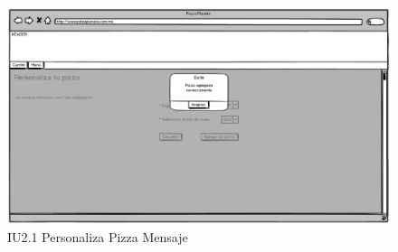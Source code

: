 \begin{itemize}
		
		\begin{figure}[h]
			
			\begin{center}				
				
				\includegraphics[scale=0.50]{imagenes/IUs/RegistroSolicitantes/iu1-IniciarSesion/IU2-1-PersonalizaPizzaMensaje.png}
				\caption{IU2.1 Personaliza Pizza Mensaje}
				\label{IU2.1}
				
			\end{center}
			
		\end{figure}
		
	\end{itemize}


